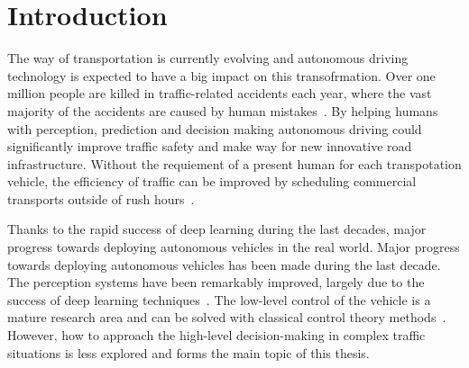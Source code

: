 \chapter{Introduction}\label{chapter:intro}
The way of transportation is currently evolving and autonomous driving technology is expected to have a big impact on this transofrmation. Over one million people are killed in traffic-related accidents each year, where the vast majority of the accidents are caused by human mistakes~\cite{WHO2018, NHTSA2018}. By helping humans with perception, prediction and decision making autonomous driving could significantly improve traffic safety and make way for new innovative road infrastructure. Without the requiement of a present human for each transpotation vehicle, the efficiency of traffic can be improved by scheduling commercial transports outside of rush hours~\cite{FAGNANT2015167}.



Thanks to the rapid success of deep learning during the last decades, major progress towards deploying autonomous vehicles in the real world.
Major progress towards deploying autonomous vehicles has been made during the last decade. The perception systems have been remarkably improved, largely due to the success of deep learning techniques~\cite{Janai2020}. The low-level control of the vehicle is a mature research area and can be solved with classical control theory methods~\cite{Paden2016}. However, how to approach the high-level decision-making in complex traffic situations is less explored and forms the main topic of this thesis.

